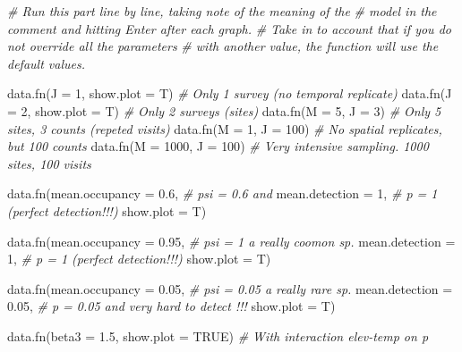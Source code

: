 \documentclass[
]{book}
\newenvironment{Shaded}{\begin{snugshade}}{\end{snugshade}}
\newcommand{\AttributeTok}[1]{\textcolor[rgb]{0.77,0.63,0.00}{#1}}
\newcommand{\CommentTok}[1]{\textcolor[rgb]{0.56,0.35,0.01}{\textit{#1}}}
\newcommand{\ConstantTok}[1]{\textcolor[rgb]{0.00,0.00,0.00}{#1}}
\newcommand{\DecValTok}[1]{\textcolor[rgb]{0.00,0.00,0.81}{#1}}
\newcommand{\FloatTok}[1]{\textcolor[rgb]{0.00,0.00,0.81}{#1}}
\newcommand{\FunctionTok}[1]{\textcolor[rgb]{0.00,0.00,0.00}{#1}}
\newcommand{\NormalTok}[1]{#1}
\begin{document}
\begin{Shaded}
\begin{Highlighting}[]
\CommentTok{\# Run this part line by line, taking note of the meaning of the }
\CommentTok{\# model in the comment and hitting Enter after each graph.}
\CommentTok{\# Take in to account that if you do not override all the parameters}
\CommentTok{\# with another value, the function will use the default values.}

\FunctionTok{data.fn}\NormalTok{(}\AttributeTok{J =} \DecValTok{1}\NormalTok{, }\AttributeTok{show.plot =}\NormalTok{ T)  }\CommentTok{\# Only 1 survey (no temporal replicate)}
\FunctionTok{data.fn}\NormalTok{(}\AttributeTok{J =} \DecValTok{2}\NormalTok{, }\AttributeTok{show.plot =}\NormalTok{ T)  }\CommentTok{\# Only 2 surveys (sites)}
\FunctionTok{data.fn}\NormalTok{(}\AttributeTok{M =} \DecValTok{5}\NormalTok{, }\AttributeTok{J =} \DecValTok{3}\NormalTok{)          }\CommentTok{\# Only 5 sites, 3 counts (repeted visits)}
\FunctionTok{data.fn}\NormalTok{(}\AttributeTok{M =} \DecValTok{1}\NormalTok{, }\AttributeTok{J =} \DecValTok{100}\NormalTok{)        }\CommentTok{\# No spatial replicates, but 100 counts}
\FunctionTok{data.fn}\NormalTok{(}\AttributeTok{M =} \DecValTok{1000}\NormalTok{, }\AttributeTok{J =} \DecValTok{100}\NormalTok{)     }\CommentTok{\# Very intensive sampling. 1000 sites, 100 visits}

\FunctionTok{data.fn}\NormalTok{(}\AttributeTok{mean.occupancy =} \FloatTok{0.6}\NormalTok{,   }\CommentTok{\# psi = 0.6 and}
        \AttributeTok{mean.detection =} \DecValTok{1}\NormalTok{,     }\CommentTok{\# p = 1 (perfect detection!!!)}
        \AttributeTok{show.plot =}\NormalTok{ T)}

\FunctionTok{data.fn}\NormalTok{(}\AttributeTok{mean.occupancy =} \FloatTok{0.95}\NormalTok{,  }\CommentTok{\# psi = 1 a really coomon sp.}
        \AttributeTok{mean.detection =} \DecValTok{1}\NormalTok{,     }\CommentTok{\# p = 1 (perfect detection!!!)}
        \AttributeTok{show.plot =}\NormalTok{ T)}

\FunctionTok{data.fn}\NormalTok{(}\AttributeTok{mean.occupancy =} \FloatTok{0.05}\NormalTok{,  }\CommentTok{\# psi = 0.05 a really rare sp.}
        \AttributeTok{mean.detection =} \FloatTok{0.05}\NormalTok{,  }\CommentTok{\# p = 0.05 and very hard to detect !!!}
        \AttributeTok{show.plot =}\NormalTok{ T)}

\FunctionTok{data.fn}\NormalTok{(}\AttributeTok{beta3 =} \FloatTok{1.5}\NormalTok{, }\AttributeTok{show.plot =} \ConstantTok{TRUE}\NormalTok{) }\CommentTok{\# With interaction elev{-}temp on p}


\end{Highlighting}
\end{Shaded}
\end{document}
